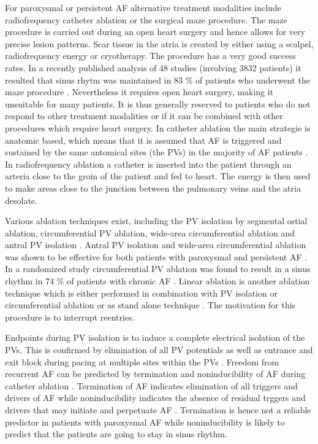 \documentclass[type=dr, dr=rernat, accentcolor=tud7b,colorbacktitle, bigchapter, openright, twoside, 12pt ]{tudthesis}
\begin{document}
For paroxysmal or persistent AF alternative treatment modalities include radiofrequency catheter ablation or the surgical maze procedure.\newline
The maze procedure is carried out during an open heart surgery and hence allows for very precise lesion patterns. Scar tissue in the atria is 
created by either using a scalpel, radiofrequency energy or cryotherapy. The procedure has a very good success rates. In a recently published 
analysis of 48 studies (involving 3832 patients) it resulted that sinus rhytm was maintained in 83 \% of patients who underwent 
the maze procedure \cite{CE09} \cite{Kha05}. Nevertheless it requires open heart surgery, making it unsuitable for many patients. It is thus 
generally reserved to patients who do not respond to other treatment modalities or if it can be combined with other procedures which require 
heart surgery. \newline
In catheter ablation the main strategie is anatomic based, which means that it is assumed that AF is triggered and sustained by the same 
antomical sites (the PVs) in the majority of AF patients \cite{CE09}. In radiofrequency ablation a catheter is inserted into the patient 
through an arteria close to the groin of the patient and fed to heart. The energy is then used to make areas close to the junction between 
the pulmonary veins and the atria desolate.\newline

Various ablation techniques exist, including the PV isolation by 
segmental ostial ablation, circumferential PV ablation, wide-area circumferential ablation and antral PV isolation \cite{Ora06} \cite{Ora03} 
\cite{Ouy04}. Antral PV isolation and wide-area circumferential ablation was shown to be effective for both patients with paroxysmal and 
persistent AF \cite{CE09} \cite{Ora03}. In a randomized study circumferential PV ablation was found to result in a sinus rhythm in 74 \% of 
patients with chronic AF \cite{Ora06}. Linear ablation is another ablation technique which is either performed in combination with PV 
isolation or circumferential ablation or as stand alone technique \cite{CE09}. The motivation for this procedure is to interrupt reentries.


Endpoints during PV isolation is to induce a complete electrical isolation of the PVs. This is confirmed by elimination of all PV potentials 
as well as entrance and exit block during pacing at multiple sites within the PVs \cite{CE09}. Freedom from recurrent AF can be predicted 
by termination and noninducibility of AF during catheter ablation \cite{} \cite{} \cite{} \cite{}. Termination of AF indicates elimination 
of all triggers and drivers of AF while noninducibility indicates the absence of residual trggers and drivers that may initiate and 
perpetuate AF \cite{CE09}. Termination is hence not a reliable predictor in patients with paroxysmal AF while noninducibility is likely 
to predict that the patients are going to stay in sinus rhythm. 
\end{document}
